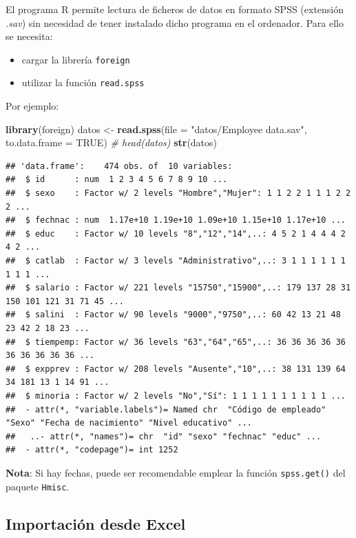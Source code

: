 \documentclass[]{book}
\newenvironment{Shaded}{\begin{snugshade}}{\end{snugshade}}
\newcommand{\KeywordTok}[1]{\textcolor[rgb]{0.13,0.29,0.53}{\textbf{#1}}}
\newcommand{\DataTypeTok}[1]{\textcolor[rgb]{0.13,0.29,0.53}{#1}}
\newcommand{\StringTok}[1]{\textcolor[rgb]{0.31,0.60,0.02}{#1}}
\newcommand{\CommentTok}[1]{\textcolor[rgb]{0.56,0.35,0.01}{\textit{#1}}}
\newcommand{\OtherTok}[1]{\textcolor[rgb]{0.56,0.35,0.01}{#1}}
\newcommand{\NormalTok}[1]{#1}
\begin{document}
El programa R permite lectura de ficheros de datos en formato SPSS
(extensión \emph{.sav}) sin necesidad de tener instalado dicho programa
en el ordenador. Para ello se necesita:

\begin{itemize}
\item
  cargar la librería \texttt{foreign}
\item
  utilizar la función \texttt{read.spss}
\end{itemize}

Por ejemplo:

\begin{Shaded}
\begin{Highlighting}[]
\KeywordTok{library}\NormalTok{(foreign)}
\NormalTok{datos <-}\StringTok{ }\KeywordTok{read.spss}\NormalTok{(}\DataTypeTok{file =} \StringTok{"datos/Employee data.sav"}\NormalTok{, }\DataTypeTok{to.data.frame =} \OtherTok{TRUE}\NormalTok{)}
\CommentTok{# head(datos)}
\KeywordTok{str}\NormalTok{(datos)}
\end{Highlighting}
\end{Shaded}

\begin{verbatim}
## 'data.frame':    474 obs. of  10 variables:
##  $ id      : num  1 2 3 4 5 6 7 8 9 10 ...
##  $ sexo    : Factor w/ 2 levels "Hombre","Mujer": 1 1 2 2 1 1 1 2 2 2 ...
##  $ fechnac : num  1.17e+10 1.19e+10 1.09e+10 1.15e+10 1.17e+10 ...
##  $ educ    : Factor w/ 10 levels "8","12","14",..: 4 5 2 1 4 4 4 2 4 2 ...
##  $ catlab  : Factor w/ 3 levels "Administrativo",..: 3 1 1 1 1 1 1 1 1 1 ...
##  $ salario : Factor w/ 221 levels "15750","15900",..: 179 137 28 31 150 101 121 31 71 45 ...
##  $ salini  : Factor w/ 90 levels "9000","9750",..: 60 42 13 21 48 23 42 2 18 23 ...
##  $ tiempemp: Factor w/ 36 levels "63","64","65",..: 36 36 36 36 36 36 36 36 36 36 ...
##  $ expprev : Factor w/ 208 levels "Ausente","10",..: 38 131 139 64 34 181 13 1 14 91 ...
##  $ minoria : Factor w/ 2 levels "No","Sí": 1 1 1 1 1 1 1 1 1 1 ...
##  - attr(*, "variable.labels")= Named chr  "Código de empleado" "Sexo" "Fecha de nacimiento" "Nivel educativo" ...
##   ..- attr(*, "names")= chr  "id" "sexo" "fechnac" "educ" ...
##  - attr(*, "codepage")= int 1252
\end{verbatim}

\textbf{Nota}: Si hay fechas, puede ser recomendable emplear la función
\texttt{spss.get()} del paquete \texttt{Hmisc}.

\subsection{Importación desde Excel}\label{importacion-desde-excel}
\end{document}
